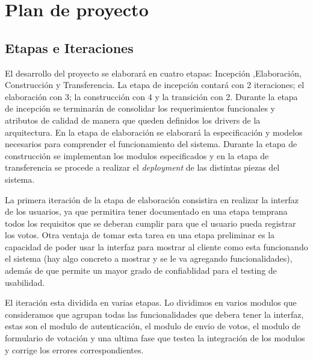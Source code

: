 \section{Plan de proyecto}

\subsection{Etapas e Iteraciones}

El desarrollo del proyecto se elaborar\'a en cuatro etapas: Incepción ,Elaboración, Construcción y Transferencia. La etapa de incepción contar\'a con 2 iteraciones; el elaboración con 3; la construcción con 4 y la transición con 2. Durante la etapa de incepción se terminar\'an de consolidar los requerimientos funcionales y atributos de calidad de manera que queden definidos los drivers de la arquitectura. En la etapa de elaboración se elaborar\'a la especificación y modelos necesarios para comprender el funcionamiento del sistema. Durante la etapa de construcción se implementan los modulos especificados y en la etapa de transferencia se procede a realizar el \textit{deployment} de las distintas piezas del sistema.  
\\ \par

La primera iteración de la etapa de elaboración consistira en realizar la interfaz de los usuarios, ya que permitira tener documentado en una etapa temprana todos los requisitos que se deberan cumplir para que el usuario pueda registrar los votos. Otra ventaja de tomar esta tarea en una etapa preliminar es la capacidad de poder usar la interfaz para mostrar al cliente como esta funcionando el sistema (hay algo concreto a mostrar y se le va agregando funcionalidades), además de que permite un mayor grado de confiablidad para el testing de usabilidad. 
\\ \par
El iteración esta dividida en varias etapas. Lo dividimos en varios modulos que consideramos que agrupan todas las funcionalidades que debera tener la interfaz, estas son el modulo de autenticación, el modulo de envio de votos, el modulo de formulario de votaci\'on y una ultima fase que testea la integraci\'on de los modulos y corrige los errores correspondientes.

